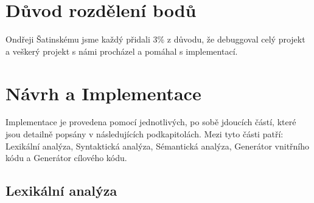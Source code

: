 \documentclass[12pt]{article}
\begin{document}
\section{Důvod rozdělení bodů}
Ondřeji Šatinskému jsme každý přidali 3\% z důvodu, že debuggoval celý projekt a veškerý projekt s námi procházel a pomáhal s implementací. 

\section{Návrh a Implementace}
Implementace je provedena pomocí jednotlivých, po sobě jdoucích částí, které jsou detailně popsány v následujících podkapitolách. Mezi tyto části patří: Lexikální analýza, Syntaktická analýza, Sémantická analýza, Generátor vnitřního kódu a Generátor cílového kódu. 

\subsection{Lexikální analýza}

\end{document}
